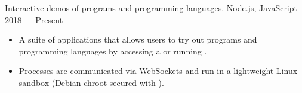 \showoff
{}
{Interactive demos of programs and programming languages.}
{Node.js, JavaScript}
{2018 --- Present}

\begin{itemize}
    \item A suite of applications that allows users to try out programs and programming languages by accessing a  or running .
    \item Processes are communicated via WebSockets and run in a lightweight Linux sandbox (Debian chroot secured with ).
\end{itemize}
